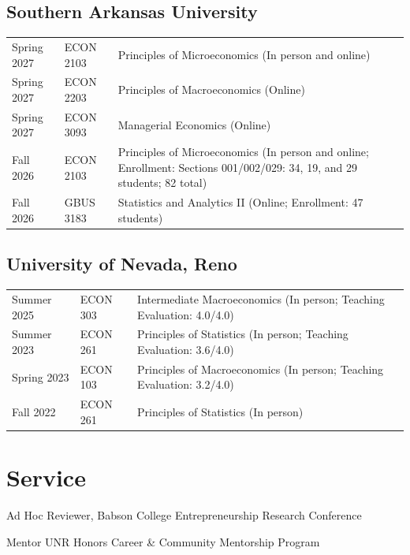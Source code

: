 \documentclass[12pt,letterpaper]{report}
\begin{document}
    \subsection*{Southern Arkansas University}
\begin{tabular}{@{}p{3.0cm}p{2.4cm}p{8.6cm}@{}}
Spring 2027 & ECON 2103 & Principles of Microeconomics (In person and online) \\
Spring 2027 & ECON 2203 & Principles of Macroeconomics (Online) \\
Spring 2027 & ECON 3093 & Managerial Economics (Online) \\
Fall 2026 & ECON 2103 & Principles of Microeconomics (In person and online; Enrollment: Sections 001/002/029: 34, 19, and 29 students; 82 total) \\
Fall 2026 & GBUS 3183 & Statistics and Analytics II (Online; Enrollment: 47 students) \\
\end{tabular}

    \subsection*{University of Nevada, Reno}
\begin{tabular}{@{}p{3.0cm}p{2.4cm}p{8.6cm}@{}}
Summer 2025 & ECON 303 & Intermediate Macroeconomics (In person; Teaching Evaluation: 4.0/4.0) \\
Summer 2023 & ECON 261 & Principles of Statistics (In person; Teaching Evaluation: 3.6/4.0) \\
Spring 2023 & ECON 103 & Principles of Macroeconomics (In person; Teaching Evaluation: 3.2/4.0) \\
Fall 2022 & ECON 261 & Principles of Statistics (In person) \\
\end{tabular}

\section*{Service}
    \begin{tablist}
        \item[2026] \tab{}Ad Hoc Reviewer, Babson College Entrepreneurship Research Conference
        \item[2025] \tab{}Mentor \tab{}UNR Honors Career \& Community Mentorship Program    
    \end{tablist}
    
\end{document}
